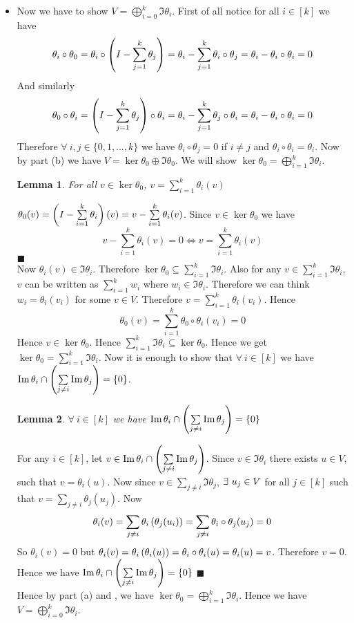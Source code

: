 \documentclass[a4paper, 11pt]{article}
\newtheorem{lemma}{Lemma}
\renewenvironment{proof}{\noindent{\it \textbf{Proof:}}\hspace*{1em}}{\hfill $\blacksquare$\bigskip\\}
\begin{document}
{\begin{itemize}
\begin{itemize}
\item 	Now we have to show $V=\bigoplus\limits_{i=0}^k\Im\theta_i$. First of all notice for all $i\in[k]$ we have $$\theta_i\circ \theta_0=\theta_i\circ\left(I-\sum\limits_{j=1}^k\theta_j\right)=\theta_i-\sum_{j=1}^k\theta_i\circ\theta_j=\theta_i-\theta_i\circ\theta_i=0$$And similarly $$\theta_0\circ \theta_i=\left(I-\sum_{j=1}^k \theta_j\right)\circ \theta_i=\theta_i-\sum_{j=1}^k \theta_j\circ\theta_i=\theta_i-\theta_i\circ\theta_i=0$$Therefore $\forall\ i,j\in\{0,1,\dots,k\}$ we have $\theta_i\circ\theta_j=0$ if $i\neq j$ and $\theta_i\circ\theta_i=\theta_i$. Now by part (b) we have $V=\ker\theta_0\oplus \Im\theta_0$. We will show $\ker\theta_0=\bigoplus\limits_{i=1}^k\Im\theta_i$.  \begin{lemma}\label{vissumimtheta}
	For all $v\in\ker\theta_0$, $v=\sum\limits_{i=1}^k \theta_i (v)$
\end{lemma}
\begin{proof}
	$\theta_0(v)=\left(I-\sum\limits_{i=1}^k\theta_i\right)(v)=v-\sum\limits_{i=1}^k\theta_i(v)$. Since $v\in \ker\theta_0$ we have $$v-\sum\limits_{i=1}^k\theta_i(v)=0\iff v=\sum\limits_{i=1}^k\theta_i(v)$$
\end{proof}Now $\theta_i(v)\in \Im\theta_i$. Therefore $\ker\theta_0\subseteq \sum\limits_{i=1}^k \Im\theta_i$. Also for any $v\in \sum\limits_{i=1}^k \Im\theta_i$, $v$ can be written as $\sum\limits_{i=1}^kw_i$ where $w_i\in\Im\theta_i$. Therefore we can think $w_i=\theta_i(v_i)$ for some $v\in V$. Therefore $v=\sum\limits_{i=1}^k\theta_i(v_i)$. Hence $$\theta_0(v)=\sum_{i=1}^k \theta_0\circ \theta_i(v_i)=0$$Hence $v\in \ker\theta_0$. Hence $\sum\limits_{i=1}^k \Im\theta_i\subseteq \ker\theta_0$. Hence we get $\ker\theta_0=\sum\limits_{i=1}^k\Im\theta_i$. Now it is enough to show that $\forall\ i\in[k]$ we have $\Im\theta_i\cap \left(\sum\limits_{j\neq i}\Im\theta_j\right)=\{0\}$.
\begin{lemma}\label{novecinthetaimages}
	$\forall\ i\in[k]$ we have $\Im\theta_i\cap \left(\sum\limits_{j\neq i}\Im\theta_j\right)=\{0\}$
\end{lemma}
\begin{proof}
	For any $i\in[k]$, let $v\in \Im\theta_i\cap \left(\sum\limits_{j\neq i}\Im\theta_j\right)$. Since $v\in\Im\theta_i$ there exists $u\in V$, such that $v=\theta_i(u)$. Now since $v\in \sum\limits_{j\neq i}\Im\theta_j$, $\exists\ u_j\in V$ for all $j\in[k]$ such that $v=\sum\limits_{j\neq i}\theta_j(u_j)$. Now $$\theta_i(v)=\sum\limits_{j\neq i}\theta_i\left(\theta_j(u_i)\right)= \sum\limits_{j\neq i}\theta_i\circ\theta_j(u_j)=0$$So $\theta_i(v)=0$ but $\theta_i(v)=\theta_i\left(\theta_i(u)\right)=\theta_i\circ\theta_i(u)=\theta_i(u)=v$. Therefore $v=0$. Hence we have $\Im\theta_i\cap \left(\sum\limits_{j\neq i}\Im\theta_j\right)=\{0\}$
\end{proof}
Hence by part (a) and ,  we have $\ker\theta_0=\bigoplus\limits_{i=1}^k \Im\theta_i$. Hence we have $V=\bigoplus\limits_{i=0}^k\Im\theta_i$.
\end{itemize}
	\end{itemize}
}
\end{document}
